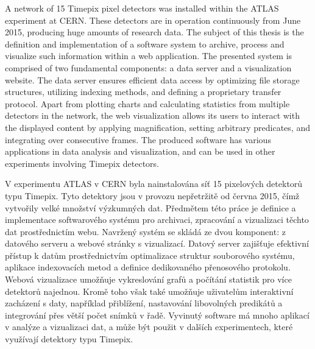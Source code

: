 \documentclass[11pt,twoside,a4paper]{book}
\begin{document}



 
	\abstractpage

	A network of 15 Timepix pixel detectors was installed within the ATLAS experiment at CERN. These detectors are in operation continuously from June 2015, producing huge amounts of research data. The subject of this thesis is the definition and implementation of a software system to archive, process and visualize such information within a web application. The presented system is comprised of two fundamental components: a data server and a visualization website. The data server ensures efficient data access by optimizing file storage structures, utilizing indexing methods, and defining a proprietary transfer protocol. Apart from plotting charts and calculating statistics from multiple detectors in the network, the web visualization allows its users to interact with the displayed content by applying magnification, setting arbitrary predicates, and integrating over consecutive frames. The produced software has various applications in data analysis and visualization, and can be used in other experiments involving Timepix detectors.


	\baselineskip

	\noindent
	V experimentu ATLAS v CERN byla nainstalována síť 15 pixelových detektorů typu Timepix. Tyto detektory jsou v provozu nepřetržitě od června 2015, čímž vytvořily velké množství výzkumných dat. Předmětem této práce je definice a implementace softwarového systému pro archivaci, zpracování a vizualizaci těchto dat prostřednictím webu. Navržený systém se skládá ze dvou komponent: z datového serveru a webové stránky s vizualizací. Datový server zajišťuje efektivní přístup k datům prostřednictvím optimalizace struktur souborového systému, aplikace indexovacích metod a definice dedikovaného přenosového protokolu. Webová vizualizace umožňuje vykreslování grafů a počítání statistik pro více detektorů najednou. Kromě toho však také umožňuje uživatelům interaktivní zacházení s daty, například přiblížení, nastavování libovolných predikátů a integrování přes větší počet snímků v řadě. Vyvinutý software má mnoho aplikací v analýze a vizualizaci dat, a může být použit v dalších experimentech, které využívají detektory typu Timepix.
\end{document}
